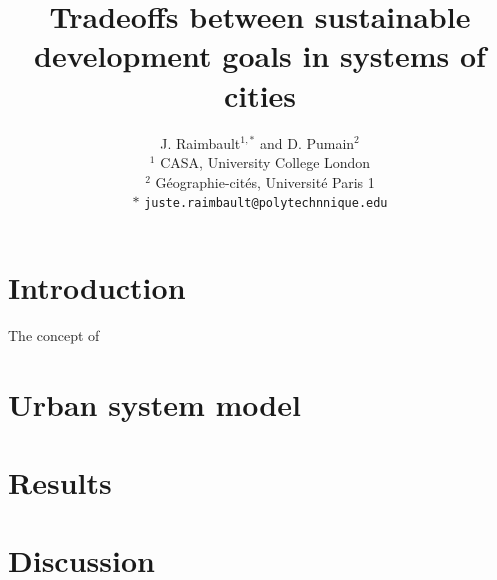 \documentclass{article}
\title{Tradeoffs between sustainable development goals in systems of cities}
\author{J. Raimbault$^{1,\ast}$ and D. Pumain$^{2}$\medskip\\
$^{1}$ CASA, University College London\\
$^{2}$ G{\'e}ographie-cit{\'e}s, Universit{\'e} Paris 1\medskip\\
$\ast$ \texttt{juste.raimbault@polytechnnique.edu}
}
\date{}
\begin{document}
\maketitle

\begin{abstract}

\end{abstract}


\section{Introduction}

The concept of 



\section{Urban system model}


\section{Results}


\section{Discussion}







\end{document}
